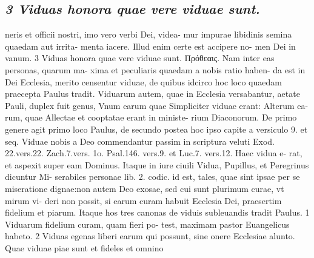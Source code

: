 \documentclass{article}
\begin{document}
\begin{pages}
\subsection*{\textit{3 Viduas honora quae vere viduae sunt.}}neris et officii nostri, imo vero verbi Dei, videa- mur impurae libidinis semina quaedam aut irrita- menta iacere. Illud enim certe est accipere no- men Dei in vanum. 3 Viduas honora quae vere viduae sunt. Πρόθεαις. Nam inter eas personas, quarum ma- xima et peculiaris quaedam a nobis ratio haben- da est in Dei Ecclesia, merito censentur viduae, de quibus idcirco hoc loco quaedam praecepta Paulus tradit. Viduarum autem, quae in Ecclesia versabantur, aetate Pauli, duplex fuit genus, Vnum earum quae Simpliciter viduae erant: Alterum ea- rum, quae Allectae et cooptatae erant in ministe- rium Diaconorum. De primo genere agit primo loco Paulus, de secundo postea hoc ipso capite a versiculo 9. et seq. Viduae nobis a Deo commendantur passim in scriptura veluti Exod. 22.vers.22. Zach.7.vers. 1o. Psal.146. vers.9. et Luc.7. vers.12. Haec vidua e- rat, et aspexit super eam Dominus. Itaque in iure ciuili Vidua, Pupillus, et Peregrinus dicuntur Mi- serabiles personae lib.  2. codic. id est, tales, quae sint ipsae per se miseratione dignae:non autem Deo exosae, sed cui sunt plurimum curae, vt mirum vi- deri non possit, si earum curam habuit Ecclesia Dei, praesertim fidelium et piarum. Itaque hos tres canonas de viduis subleuandis tradit Paulus. 1 Viduarum fidelium curam, quam fieri po- test, maximam pastor Euangelicus habeto. 2 Viduas egenas liberi earum qui possunt, sine onere Ecclesiae alunto. Quae viduae piae sunt et fideles et omnino  \pend

\end{pages}
\end{document}
